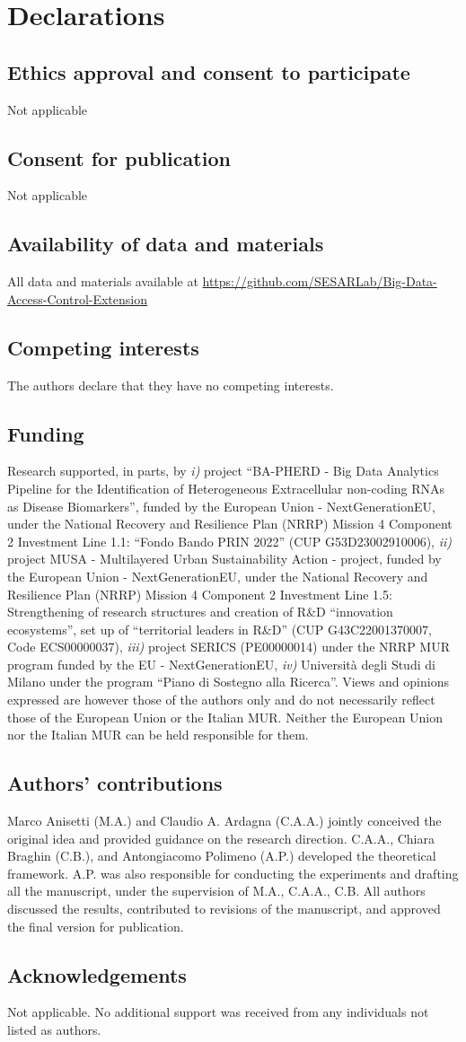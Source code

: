 \section{Declarations}
\subsection{Ethics approval and consent to participate}
Not applicable
\subsection{Consent for publication}
Not applicable
\subsection{Availability of data and materials}
All data and materials available at \url{https://github.com/SESARLab/Big-Data-Access-Control-Extension}
\subsection{Competing interests}
The authors declare that they have no competing interests.
\subsection{Funding}
Research supported, in parts, by \emph{i)} project ``BA-PHERD - Big Data Analytics Pipeline for the Identification of Heterogeneous Extracellular non-coding RNAs as Disease Biomarkers'', funded by the European Union - NextGenerationEU, under the National Recovery and Resilience Plan (NRRP) Mission 4 Component 2 Investment Line 1.1: “Fondo Bando PRIN 2022” (CUP G53D23002910006), \emph{ii)} project MUSA - Multilayered Urban Sustainability Action - project, funded by the European Union - NextGenerationEU, under the National Recovery and Resilience Plan (NRRP) Mission 4 Component 2 Investment Line 1.5: Strengthening of research structures and creation of R\&D ``innovation ecosystems'', set up of ``territorial leaders in R\&D'' (CUP  G43C22001370007, Code ECS00000037), \emph{iii)} project SERICS (PE00000014) under the NRRP MUR program funded by the EU - NextGenerationEU, \emph{iv)} Università degli Studi di Milano under the program ``Piano di Sostegno alla Ricerca''. Views and opinions expressed are however those of the authors only and do not necessarily reflect those of the European Union or the Italian MUR. Neither the European Union nor the Italian MUR can be held responsible for them.
\subsection{Authors' contributions}
Marco Anisetti (M.A.) and Claudio A. Ardagna (C.A.A.) jointly conceived the original idea and provided guidance on the research direction. C.A.A., Chiara Braghin (C.B.), and Antongiacomo Polimeno (A.P.) developed the theoretical framework. A.P. was also responsible for conducting the experiments and drafting all the manuscript, under the supervision of M.A., C.A.A., C.B. All authors discussed the results, contributed to revisions of the manuscript, and approved the final version for publication.

\subsection{Acknowledgements}
Not applicable. No additional support was received from any individuals not listed as authors.